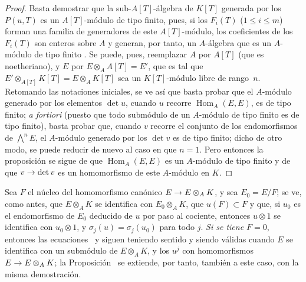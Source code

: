 \documentclass[oneside,10pt]{amsart}
\makeatletter
\renewcommand{\leq}{\leqslant}
\newcommand{\ega@arrow}[2]{\mathchoice{#1}{#2}{#2}{#2}}
\renewcommand{\to}{\ega@arrow{\longrightarrow}{\rightarrow}}
\newcommand{\oldpage}[2][]{\marginnote{\normalfont\footnotesize\textbf{#1}~|~#2}\ignorespaces}
\makeatother
\begin{document}
\begin{remark}[6.4.7]
\begin{proof}
Basta demostrar que la sub-$A[T]$-álgebra de $K[T]$ generada por los $P(u,T)$ es un $A[T]$-módulo de tipo finito, pues, si los $F_i(T)$ ($1\leq i\leq m$) forman una familia de generadores de este $A[T]$-módulo, los coeficientes de los $F_i(T)$ son enteros sobre $A$ y generan, por tanto, un $A$-álgebra que es un $A$-módulo de tipo finito \cite[t.~I, p.~255, th.~1]{I-13}.
\oldpage[II]{123}
Se puede, pues, reemplazar $A$ por $A[T]$ (que es noetheriano), y $E$ por $E\otimes_AA[T]=E'$, que es tal que $E'\otimes_{A[T]}K[T]=E\otimes_AK[T]$ sea un $K[T]$-módulo libre de rango~$n$.
Retomando las notaciones iniciales, se ve así que basta probar que el $A$-módulo generado por los elementos $\det u$, cuando $u$ recorre $\operatorname{Hom}_A(E,E)$, es de tipo finito;
\emph{a fortiori} (puesto que todo submódulo de un $A$-módulo de tipo finito es de tipo finito), basta probar que, cuando $v$ recorre el conjunto de los endomorfismos de $\bigwedge^nE$, el $A$-módulo generado por los $\det v$ es de tipo finito;
dicho de otro modo, se puede reducir de nuevo al caso en que $n=1$.
Pero entonces la proposición se sigue de que $\operatorname{Hom}_A(E,E)$ es un $A$-módulo de tipo finito y de que $v\to\det v$ es un homomorfismo de este $A$-módulo en $K$.
\end{proof}

Sea $F$ el núcleo del homomorfismo canónico $E\to E\otimes_AK$, y sea $E_0=E/F$;
se ve, como antes, que $E\otimes_AK$ se identifica con $E_0\otimes_AK$, que $u(F)\subset F$ y que, si $u_0$ es el endomorfismo de $E_0$ deducido de $u$ por paso al cociente, entonces $u\otimes1$ se identifica con $u_0\otimes1$, y $\sigma_j(u)=\sigma_j(u_0)$ para todo $j$.
\emph{Si se tiene $F=0$}, entonces las ecuaciones~ y  siguen teniendo sentido y siendo válidas cuando $E$ se identifica con un submódulo de $E\otimes_AK$, y los $u^j$ con homomorfismos $E\to E\otimes_AK$;
la Proposición~ se extiende, por tanto, también a este caso, con la misma demostración.
\end{remark}
\end{document}
